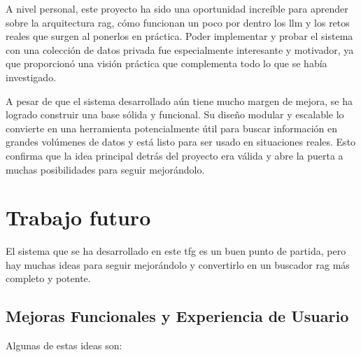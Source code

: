A nivel personal, este proyecto ha sido una oportunidad increíble para aprender sobre la arquitectura \gls{rag}, cómo funcionan un poco por dentro los \gls{llm} y los retos reales que surgen al ponerlos en práctica. Poder implementar y probar el sistema con una colección de datos privada fue especialmente interesante y motivador, ya que proporcionó una visión práctica que complementa todo lo que se había investigado.

A pesar de que el sistema desarrollado aún tiene mucho margen de mejora, se ha logrado construir una base sólida y funcional. Su diseño modular y escalable lo convierte en una herramienta potencialmente útil para buscar información en grandes volúmenes de datos y está listo para ser usado en situaciones reales. Esto confirma que la idea principal detrás del proyecto era válida y abre la puerta a muchas posibilidades para seguir mejorándolo.

\section{Trabajo futuro}
\label{trabajo_futuro}

El sistema que se ha desarrollado en este \gls{tfg} es un buen punto de partida, pero hay muchas ideas para seguir mejorándolo y convertirlo en un buscador \gls{rag} más completo y potente.

\subsection{Mejoras Funcionales y Experiencia de Usuario}
Algunas de estas ideas son:

